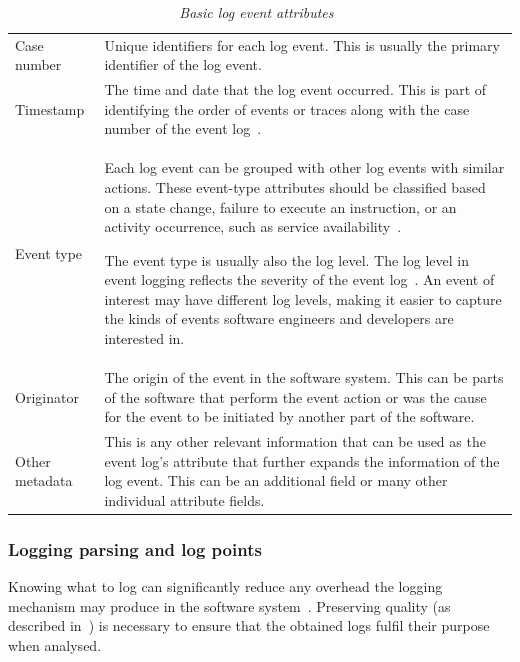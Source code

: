 \begin{table}[!htb]
	\centering
	\caption[Basic log event attributes]
	{\textit{Basic log event attributes~\cite{Bekeneva2020}}}
	\label{tbl:ch1_logBasicAttributes}
	\begin{tabularx}{\textwidth}{lX}
		\toprule 
		\thead{Attribute} & \thead{Description} \\
		\midrule

		\rowcolor{lightgray}
		Case number & Unique identifiers for each log event. This is usually the primary identifier of the log event. \\

		Timestamp & The time and date that the log event occurred. This is part of identifying the order of events or traces along with the case number of the event log~\cite{Kherbouche2017}. \\

		\rowcolor{lightgray}
		Event type & Each log event can be grouped with other log events with similar actions. These event-type attributes should be classified based on a state change, failure to execute an instruction, or an activity occurrence, such as service availability~\cite{Fedaghi2010}. \par The event type is usually also the log level. The log level in event logging reflects the severity of the event log~\cite{Rong2020}. An event of interest may have different log levels, making it easier to capture the kinds of events software engineers and developers are interested in. \\

		Originator & The origin of the event in the software system. This can be parts of the software that perform the event action or was the cause for the event to be initiated by another part of the software. \\

		\rowcolor{lightgray}
		Other metadata & This is any other relevant information that can be used as the event log's attribute that further expands the information of the log event. This can be an additional field or many other individual attribute fields.\\
		\bottomrule
	\end{tabularx}
\end{table}

\clearpage

\subsubsection{Logging parsing and log points}\label{sec:ch1_loggignPoints}
Knowing what to log can significantly reduce any overhead the logging mechanism may produce in the software system~\cite{Jia2018, Pecchia2015}. Preserving quality (as described in~) is necessary to ensure that the obtained logs fulfil their purpose when analysed.

